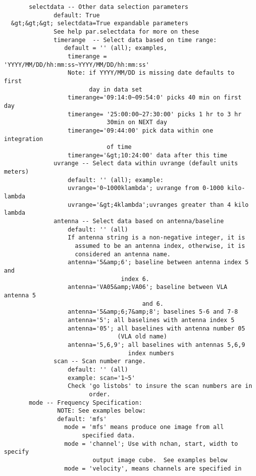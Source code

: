 \begin{verbatim}
       selectdata -- Other data selection parameters
              default: True
  &gt;&gt;&gt; selectdata=True expandable parameters
              See help par.selectdata for more on these
              timerange  -- Select data based on time range:
                 default = '' (all); examples,
                  timerange = 'YYYY/MM/DD/hh:mm:ss~YYYY/MM/DD/hh:mm:ss'
                  Note: if YYYY/MM/DD is missing date defaults to first 
                        day in data set
                  timerange='09:14:0~09:54:0' picks 40 min on first day
                  timerange= '25:00:00~27:30:00' picks 1 hr to 3 hr 
                             30min on NEXT day
                  timerange='09:44:00' pick data within one integration 
                             of time
                  timerange='&gt;10:24:00' data after this time
              uvrange -- Select data within uvrange (default units meters)
                  default: '' (all); example:
                  uvrange='0~1000klambda'; uvrange from 0-1000 kilo-lambda
                  uvrange='&gt;4klambda';uvranges greater than 4 kilo lambda
              antenna -- Select data based on antenna/baseline
                  default: '' (all)
                  If antenna string is a non-negative integer, it is 
                    assumed to be an antenna index, otherwise, it is
                    considered an antenna name.
                  antenna='5&amp;6'; baseline between antenna index 5 and 
                                 index 6.
                  antenna='VA05&amp;VA06'; baseline between VLA antenna 5 
                                       and 6.
                  antenna='5&amp;6;7&amp;8'; baselines 5-6 and 7-8
                  antenna='5'; all baselines with antenna index 5
                  antenna='05'; all baselines with antenna number 05 
                                (VLA old name)
                  antenna='5,6,9'; all baselines with antennas 5,6,9 
                                   index numbers
              scan -- Scan number range.
                  default: '' (all)
                  example: scan='1~5'
                  Check 'go listobs' to insure the scan numbers are in 
                        order.
       mode -- Frequency Specification:
               NOTE: See examples below:
               default: 'mfs'
                 mode = 'mfs' means produce one image from all 
                      specified data.
                 mode = 'channel'; Use with nchan, start, width to specify
                         output image cube.  See examples below
                 mode = 'velocity', means channels are specified in 

\end{verbatim}

